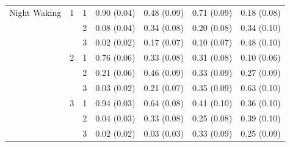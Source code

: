 \documentclass[11pt]{article}
\theoremstyle{plain}
\theoremstyle{definition}
\begin{document}
\begin{longtable}{clccccc}
Night Waking  & 1 & 1  & 0.90 (0.04) &  0.48  (0.09) & 0.71  (0.09) & 0.18 (0.08)\\
 & & 2  & 0.08 (0.04) &  0.34  (0.08) &  0.20 (0.08) & 0.34 (0.10)\\
 & & 3  & 0.02 (0.02) &  0.17  (0.07) &  0.10 (0.07) & 0.48 (0.10)\\
  & 2 & 1  & 0.76 (0.06) &  0.33  (0.08) & 0.31  (0.08) & 0.10 (0.06)\\
 & & 2  & 0.21 (0.06) &  0.46  (0.09) &  0.33 (0.09) & 0.27 (0.09)\\
 & & 3  & 0.03 (0.02) &  0.21  (0.07) &  0.35 (0.09) & 0.63 (0.10)\\
   & 3 & 1  & 0.94 (0.03) &  0.64  (0.08) & 0.41  (0.10) & 0.36 (0.10)\\
 & & 2  & 0.04 (0.03) &  0.33  (0.08) &  0.25 (0.08) & 0.39 (0.10)\\
 & & 3  & 0.02 (0.02) &  0.03  (0.03) & 0.33  (0.09) & 0.25 (0.09)\\
 

\end{longtable}
\end{document}
